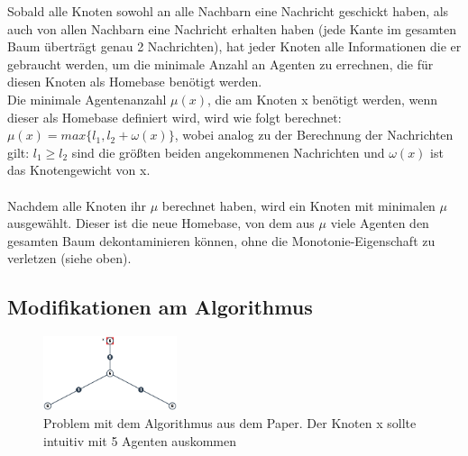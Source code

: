 Sobald alle Knoten sowohl an alle Nachbarn eine Nachricht geschickt haben, als auch von allen Nachbarn eine Nachricht erhalten haben (jede Kante im gesamten Baum überträgt genau 2 Nachrichten), hat jeder Knoten alle Informationen die er gebraucht werden, um die minimale Anzahl an Agenten zu errechnen, die für diesen Knoten als Homebase benötigt werden.
\\
Die minimale Agentenanzahl $\mu(x)$, die am Knoten x benötigt werden, wenn dieser als Homebase definiert wird, wird wie folgt berechnet:
\\
$\mu(x) = max\{l_{1},  l_{2} + \omega(x)\}$, wobei analog zu der Berechnung der Nachrichten gilt: $l_{1} \ge l_{2}$ sind die größten beiden angekommenen Nachrichten und $\omega(x)$ ist das Knotengewicht von x.
\\
\\
Nachdem alle Knoten ihr $\mu$ berechnet haben, wird ein Knoten mit minimalen $\mu$ ausgewählt. Dieser ist die neue Homebase, von dem aus $\mu$ viele Agenten den gesamten Baum dekontaminieren können, ohne die Monotonie-Eigenschaft zu verletzen (siehe oben).

\newpage

\subsection{Modifikationen am Algorithmus}


	\begin{figure}
		\begin{center}
			\includegraphics[width=0.35\textwidth]{bilder/abb_paper_problem.png}
		\end{center}
		\caption{Problem mit dem Algorithmus aus dem Paper. Der Knoten x sollte intuitiv mit 5 Agenten auskommen}
		\label{fig:negBeispielPaperAlgo}
	\end{figure}

